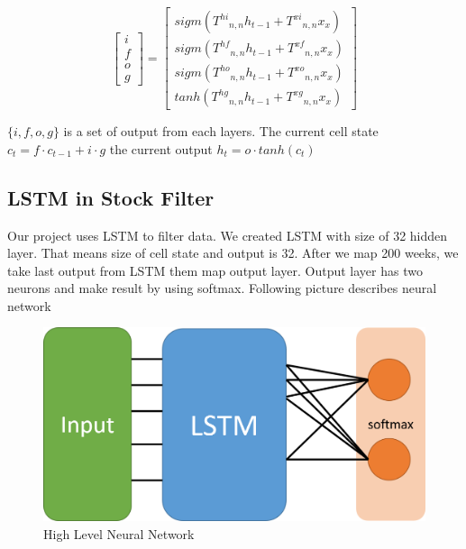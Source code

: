 \documentclass[12pt]{article}
\begin{document}
\begin{enumerate}
\[
\begin{bmatrix}
    i \\
    f \\
    o \\
    g
\end{bmatrix}
=
\begin{bmatrix}
    sigm({T^{hi}}_{n,n}h_{t-1} + {T^{xi}}_{n,n}x_{x}) \\
    sigm({T^{hf}}_{n,n}h_{t-1} + {T^{xf}}_{n,n}x_{x}) \\
    sigm({T^{ho}}_{n,n}h_{t-1} + {T^{xo}}_{n,n}x_{x}) \\
    tanh({T^{hg}}_{n,n}h_{t-1} + {T^{xg}}_{n,n}x_{x})
\end{bmatrix}
\]

$\{i, f, o, g\}$ is a set of output from each layers.
The current cell state $c_t = f \cdot c_{t-1} + i \cdot g$
the current output $h_t = o \cdot tanh(c_t)$

\end{enumerate}

\subsection{LSTM in Stock Filter}
Our project uses LSTM to filter data. We created LSTM with size of 32 hidden layer. That means size of cell state and output is 32. After we map 200 weeks, we take last output from LSTM them map output layer. Output layer has two neurons and make result by using softmax. Following picture describes neural network

\begin{figure}[H]
	\begin{center}
	\includegraphics[scale=0.7]{./pictures/FSFNN.png}
	\caption{High Level Neural Network}
	\label{GD}
	\end{center}
\end{figure}
\end{document}
